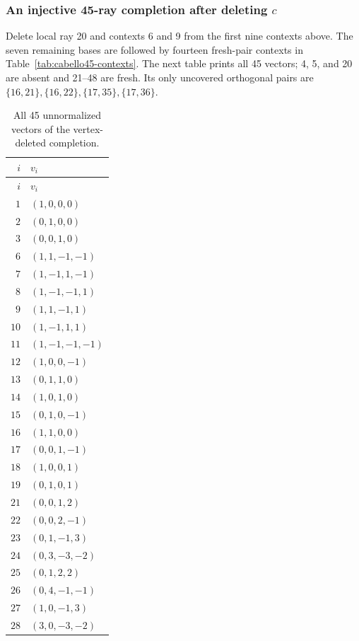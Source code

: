\documentclass[aps,pra,reprint,superscriptaddress,longbibliography,nofootinbib,floatfix,10pt]{revtex4-2}
\theoremstyle{definition}
\begin{document}
\subsubsection{An injective 45-ray completion after deleting \texorpdfstring{$c$}{c}}\label{app:cabello45-vectors}
Delete local ray 20 and contexts 6 and 9 from the first nine contexts
above. The seven remaining bases are followed by fourteen fresh-pair
contexts in Table~\ref{tab:cabello45-contexts}. The next table prints
all 45 vectors; 4, 5, and 20 are absent and 21--48 are fresh.
Its only uncovered orthogonal pairs are
$\{16,21\},\{16,22\},\{17,35\},\{17,36\}$.
\begingroup\small
{}
\begin{longtable}{rl}
\caption{All 45 unnormalized vectors of the vertex-deleted completion.}\label{tab:cabello45-vectors}\\
\toprule
$i$ & $v_i$\\\midrule
\endfirsthead
\toprule
$i$ & $v_i$\\\midrule
\endhead
\bottomrule\endfoot
$1$ & $(1,0,0,0)$\\
$2$ & $(0,1,0,0)$\\
$3$ & $(0,0,1,0)$\\
$6$ & $(1,1,-1,-1)$\\
$7$ & $(1,-1,1,-1)$\\
$8$ & $(1,-1,-1,1)$\\
$9$ & $(1,1,-1,1)$\\
$10$ & $(1,-1,1,1)$\\
$11$ & $(1,-1,-1,-1)$\\
$12$ & $(1,0,0,-1)$\\
$13$ & $(0,1,1,0)$\\
$14$ & $(1,0,1,0)$\\
$15$ & $(0,1,0,-1)$\\
$16$ & $(1,1,0,0)$\\
$17$ & $(0,0,1,-1)$\\
$18$ & $(1,0,0,1)$\\
$19$ & $(0,1,0,1)$\\
$21$ & $(0,0,1,2)$\\
$22$ & $(0,0,2,-1)$\\
$23$ & $(0,1,-1,3)$\\
$24$ & $(0,3,-3,-2)$\\
$25$ & $(0,1,2,2)$\\
$26$ & $(0,4,-1,-1)$\\
$27$ & $(1,0,-1,3)$\\
$28$ & $(3,0,-3,-2)$\\

\end{longtable}
\end{document}
